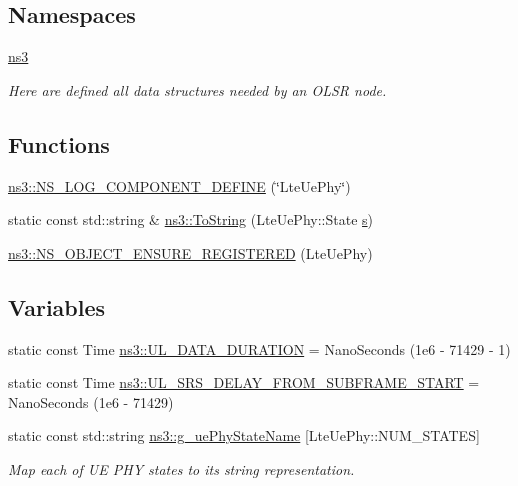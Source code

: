 \subsection*{Namespaces}
\begin{DoxyCompactItemize}
\item 
 \hyperlink{namespacens3}{ns3}
\begin{DoxyCompactList}\small\item\em Here are defined all data structures needed by an O\+L\+SR node. \end{DoxyCompactList}\end{DoxyCompactItemize}
\subsection*{Functions}
\begin{DoxyCompactItemize}
\item 
\hyperlink{namespacens3_a1d44556880a9bee7276a12308f30d21d}{ns3\+::\+N\+S\+\_\+\+L\+O\+G\+\_\+\+C\+O\+M\+P\+O\+N\+E\+N\+T\+\_\+\+D\+E\+F\+I\+NE} (\char`\"{}Lte\+Ue\+Phy\char`\"{})
\item 
static const std\+::string \& \hyperlink{namespacens3_ae04b64c5a8bc07b7ad71657d068815c4}{ns3\+::\+To\+String} (Lte\+Ue\+Phy\+::\+State \hyperlink{generate__test__data__lte__sinr_8m_ad83eeb3a142285d1243a08c6b7026df8}{s})
\item 
\hyperlink{namespacens3_a14c2fd22369690272d53eec0c21efceb}{ns3\+::\+N\+S\+\_\+\+O\+B\+J\+E\+C\+T\+\_\+\+E\+N\+S\+U\+R\+E\+\_\+\+R\+E\+G\+I\+S\+T\+E\+R\+ED} (Lte\+Ue\+Phy)
\end{DoxyCompactItemize}
\subsection*{Variables}
\begin{DoxyCompactItemize}
\item 
static const Time \hyperlink{namespacens3_a55e73a4f68b7fd8e7e343507882a0c05}{ns3\+::\+U\+L\+\_\+\+D\+A\+T\+A\+\_\+\+D\+U\+R\+A\+T\+I\+ON} = Nano\+Seconds (1e6 -\/ 71429 -\/ 1)
\item 
static const Time \hyperlink{namespacens3_a85ae230963eb2180511edbe90b9b6a22}{ns3\+::\+U\+L\+\_\+\+S\+R\+S\+\_\+\+D\+E\+L\+A\+Y\+\_\+\+F\+R\+O\+M\+\_\+\+S\+U\+B\+F\+R\+A\+M\+E\+\_\+\+S\+T\+A\+RT} = Nano\+Seconds (1e6 -\/ 71429)
\item 
static const std\+::string \hyperlink{namespacens3_a047814dfb3a6253d507f26fbee7a6584}{ns3\+::g\+\_\+ue\+Phy\+State\+Name} \mbox{[}Lte\+Ue\+Phy\+::\+N\+U\+M\+\_\+\+S\+T\+A\+T\+ES\mbox{]}
\begin{DoxyCompactList}\small\item\em Map each of UE P\+HY states to its string representation. \end{DoxyCompactList}\end{DoxyCompactItemize}
